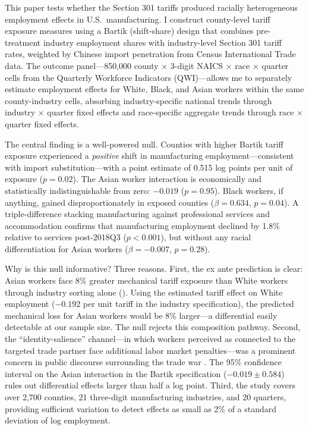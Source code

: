 \documentclass[12pt]{article}
\begin{document}
This paper tests whether the Section 301 tariffs produced racially heterogeneous employment effects in U.S.\ manufacturing. I construct county-level tariff exposure measures using a Bartik (shift-share) design that combines pre-treatment industry employment shares with industry-level Section 301 tariff rates, weighted by Chinese import penetration from Census International Trade data. The outcome panel---850,000 county $\times$ 3-digit NAICS $\times$ race $\times$ quarter cells from the Quarterly Workforce Indicators (QWI)---allows me to separately estimate employment effects for White, Black, and Asian workers within the same county-industry cells, absorbing industry-specific national trends through industry $\times$ quarter fixed effects and race-specific aggregate trends through race $\times$ quarter fixed effects.

The central finding is a well-powered null. Counties with higher Bartik tariff exposure experienced a \textit{positive} shift in manufacturing employment---consistent with import substitution---with a point estimate of 0.515 log points per unit of exposure ($p = 0.02$). The Asian worker interaction is economically and statistically indistinguishable from zero: $-0.019$ ($p = 0.95$). Black workers, if anything, gained disproportionately in exposed counties ($\beta = 0.634$, $p = 0.04$). A triple-difference stacking manufacturing against professional services and accommodation confirms that manufacturing employment declined by 1.8\% relative to services post-2018Q3 ($p < 0.001$), but without any racial differentiation for Asian workers ($\beta = -0.007$, $p = 0.28$).

Why is this null informative? Three reasons. First, the ex ante prediction is clear: Asian workers face 8\% greater mechanical tariff exposure than White workers through industry sorting alone (). Using the estimated tariff effect on White employment ($-0.192$ per unit tariff in the industry specification), the predicted mechanical loss for Asian workers would be 8\% larger---a differential easily detectable at our sample size. The null rejects this composition pathway. Second, the ``identity-salience'' channel---in which workers perceived as connected to the targeted trade partner face additional labor market penalties---was a prominent concern in public discourse surrounding the trade war \citep{gee2021anti}. The 95\% confidence interval on the Asian interaction in the Bartik specification ($-0.019 \pm 0.584$) rules out differential effects larger than half a log point. Third, the study covers over 2,700 counties, 21 three-digit manufacturing industries, and 20 quarters, providing sufficient variation to detect effects as small as 2\% of a standard deviation of log employment.
\end{document}
